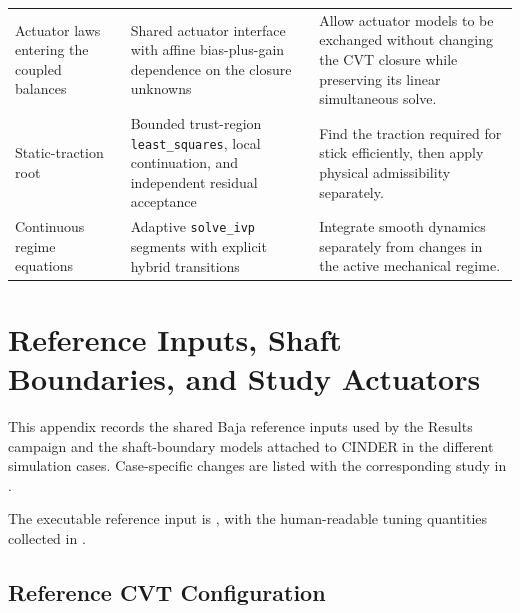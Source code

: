 \documentclass[11pt]{report}
\numberwithin{equation}{section}
\begin{document}
\begin{center}
\begin{longtable}{@{}>{\raggedright\arraybackslash}p{}>{\raggedright\arraybackslash}p{}>{\raggedright\arraybackslash}p{}@{}}
Actuator laws entering the coupled balances
& Shared actuator interface with affine bias-plus-gain dependence on the closure unknowns
& Allow actuator models to be exchanged without changing the CVT closure while preserving its linear simultaneous solve. \\[5pt]
Static-traction root
& Bounded trust-region \texttt{least\_squares}, local continuation, and independent residual acceptance
& Find the traction required for stick efficiently, then apply physical admissibility separately. \\[5pt]
Continuous regime equations
& Adaptive \texttt{solve\_ivp} segments with explicit hybrid transitions
& Integrate smooth dynamics separately from changes in the active mechanical regime. \\[5pt]
\end{longtable}
\normalsize
\end{center}

\chapter{Reference Inputs, Shaft Boundaries, and Study Actuators}
\label{app:reference_configuration}

This appendix records the shared Baja reference inputs used by the Results
campaign and the shaft-boundary models attached to CINDER in the different
simulation cases.  Case-specific changes are listed with the corresponding
study in .

The executable reference input is
,
with the human-readable tuning quantities collected in
.

\section{Reference CVT Configuration}
\label{app:common_physical_configuration}
\end{document}
